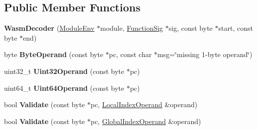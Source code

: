 \subsection*{Public Member Functions}
\begin{DoxyCompactItemize}
\item 
{\bfseries Wasm\+Decoder} (\hyperlink{structv8_1_1internal_1_1wasm_1_1_module_env}{Module\+Env} $\ast$module, \hyperlink{classv8_1_1internal_1_1_signature}{Function\+Sig} $\ast$sig, const byte $\ast$start, const byte $\ast$end)\hypertarget{classv8_1_1internal_1_1wasm_1_1_wasm_decoder_ab9b56aed36208b2d60f45d66836ca47c}{}\label{classv8_1_1internal_1_1wasm_1_1_wasm_decoder_ab9b56aed36208b2d60f45d66836ca47c}

\item 
byte {\bfseries Byte\+Operand} (const byte $\ast$pc, const char $\ast$msg=\char`\"{}missing 1-\/byte operand\char`\"{})\hypertarget{classv8_1_1internal_1_1wasm_1_1_wasm_decoder_ab89b8e317351e56d23fcf58b0dda5117}{}\label{classv8_1_1internal_1_1wasm_1_1_wasm_decoder_ab89b8e317351e56d23fcf58b0dda5117}

\item 
uint32\+\_\+t {\bfseries Uint32\+Operand} (const byte $\ast$pc)\hypertarget{classv8_1_1internal_1_1wasm_1_1_wasm_decoder_aa6bee8a56fb9ca6f0c8d2dc5c9d7bd7d}{}\label{classv8_1_1internal_1_1wasm_1_1_wasm_decoder_aa6bee8a56fb9ca6f0c8d2dc5c9d7bd7d}

\item 
uint64\+\_\+t {\bfseries Uint64\+Operand} (const byte $\ast$pc)\hypertarget{classv8_1_1internal_1_1wasm_1_1_wasm_decoder_a5ae643660687a46d350d1e91a0748268}{}\label{classv8_1_1internal_1_1wasm_1_1_wasm_decoder_a5ae643660687a46d350d1e91a0748268}

\item 
bool {\bfseries Validate} (const byte $\ast$pc, \hyperlink{structv8_1_1internal_1_1wasm_1_1_local_index_operand}{Local\+Index\+Operand} \&operand)\hypertarget{classv8_1_1internal_1_1wasm_1_1_wasm_decoder_a4d52ecf0169fa84e5b320566bc3b9181}{}\label{classv8_1_1internal_1_1wasm_1_1_wasm_decoder_a4d52ecf0169fa84e5b320566bc3b9181}

\item 
bool {\bfseries Validate} (const byte $\ast$pc, \hyperlink{structv8_1_1internal_1_1wasm_1_1_global_index_operand}{Global\+Index\+Operand} \&operand)\hypertarget{classv8_1_1internal_1_1wasm_1_1_wasm_decoder_a9471b24e7ecfd687cdb6901e8727ad17}{}\label{classv8_1_1internal_1_1wasm_1_1_wasm_decoder_a9471b24e7ecfd687cdb6901e8727ad17}


\end{DoxyCompactItemize}
